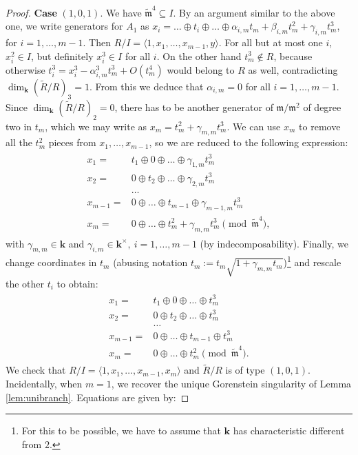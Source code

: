 \documentclass{compositio}
\renewcommand{\k}{\mathbf k}
\newcommand{\m}{\mathfrak m}
\newcommand{\tR}{\widetilde{R}}
\newcommand{\tm}{\widetilde{\mathfrak m}}
\theoremstyle{plain}
\theoremstyle{definition}
\theoremstyle{remark}
\begin{document}
\begin{proof}
 \textbf{Case} $(1,0,1)$. We have $\tm^4\subseteq I$. By an argument similar to the above one, we write generators for $A_1$ as $x_i=\ldots\oplus t_i\oplus\ldots \oplus\alpha_{i,m}t_m+\beta_{i,m}t_m^2+\gamma_{i,m}t_m^3$, for $i=1,\ldots,m-1$.
 Then $R/I=\langle 1,x_1,\ldots,x_{m-1},y\rangle$. For all but at most one $i$, $x_i^2\in I$, but definitely $x_i^3\in I$ for all $i$. On the other hand $t_m^3\notin R$, because otherwise $t_i^3=x_i^3-\alpha_{i,m}^3t_m^3+O(t_m^4)$ would belong to $R$ as well, contradicting $\dim_\k(\tR/R)_3=1$. From this we deduce that $\alpha_{i,m}=0$ for all $i=1,\ldots,m-1$. Since $\dim_\k(\tR/R)_2=0$, there has to be another generator of $\m/\m^2$ of degree two in $t_m$, which we may write as $x_m=t_m^2+\gamma_{m,m}t_m^3$. We can use $x_m$ to remove all the $t_m^2$ pieces from $x_1,\ldots,x_{m-1}$, so we are reduced to the following expression:
  \begin{align}\label{coordIII-cs}
 \begin{split}
  x_1= & t_1\oplus0\oplus\ldots\oplus \gamma_{1,m}t_m^3\\
  x_2= & 0\oplus t_2\oplus\ldots\oplus \gamma_{2,m}t_m^3\\
  &\ldots\\
  x_{m-1}= & 0\oplus\ldots\oplus t_{m-1}\oplus \gamma_{m-1,m}t_m^3\\
  x_m= & 0\oplus\ldots\oplus t_m^2+\gamma_{m,m}t_m^3 \pmod{\tm^4},
  \end{split}
 \end{align}
 with $\gamma_{m,m}\in\k$ and $\gamma_{i,m}\in\k^\times,\ i=1,\ldots,m-1$ (by indecomposability). Finally, we change coordinates in $t_m$ (abusing notation $t_m:=t_m\sqrt{1+\gamma_{m,m}t_m}$)\footnote{For this to be possible, we have to assume that $\k$ has characteristic different from $2$.} and rescale the other $t_i$ to obtain:
 \begin{align}\label{coordIII}
 \begin{split}
  x_1= & t_1\oplus0\oplus\ldots\oplus t_m^3\\
  x_2= & 0\oplus t_2\oplus\ldots\oplus t_m^3\\
  &\ldots\\
  x_{m-1}= & 0\oplus\ldots\oplus t_{m-1}\oplus t_m^3\\
  x_m= & 0\oplus\ldots\oplus t_m^2 \pmod{\tm^4}.
  \end{split}
 \end{align}
 We check that $R/I=\langle 1,x_1,\ldots,x_{m-1},x_m\rangle$ and $\tR/R$ is of type $(1,0,1)$. Incidentally, when $m=1$, we recover the unique Gorenstein singularity of Lemma \ref{lem:unibranch}. Equations are given by:

\end{proof}
\end{document}
